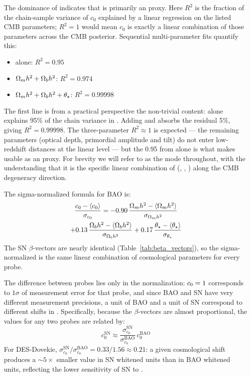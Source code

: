 The dominance of \omh indicates that \czero is primarily an \omh proxy. Here $R^2$ is the fraction of the chain-sample variance of $c_0$ explained by a linear regression on the listed CMB parameters; $R^2 = 1$ would mean $c_0$ is exactly a linear combination of those parameters across the CMB posterior. Sequential multi-parameter fits quantify this:
\begin{itemize}
\item \omh alone: $R^2 = 0.95$
\item $\Omega_m h^2 + \Omega_b h^2$: $R^2 = 0.974$
\item $\Omega_m h^2 + \Omega_b h^2 + \theta_\star$: $R^2 = 0.99998$
\end{itemize}
The first line is from a practical perspective the non-trivial content: \omh alone explains 95\% of the chain variance in \czero. Adding \obh and \thetastar absorbs the residual 5\%, giving $R^2 = 0.99998$. The three-parameter $R^2 \approx 1$ is expected --- the remaining \LCDM parameters (optical depth, primordial amplitude and tilt) do not enter low-redshift distances at the linear level --- but the 0.95 from \omh alone is what makes \czero usable as an \omh proxy. For brevity we will refer to \czero as the \omh mode throughout, with the understanding that it is the specific linear combination of (\omh, \obh, \thetastar) along the CMB degeneracy direction.


The sigma-normalized formula for BAO is:
\begin{multline}
\frac{c_0 - \langle c_0 \rangle}{\sigma_{c_0}} = -0.90\, \frac{\Omega_m h^2 - \langle \Omega_m h^2 \rangle}{\sigma_{\Omega_m h^2}} \\
+ 0.13\, \frac{\Omega_b h^2 - \langle \Omega_b h^2 \rangle}{\sigma_{\Omega_b h^2}} + 0.17\, \frac{\theta_\star - \langle \theta_\star \rangle}{\sigma_{\theta_\star}}
\label{eq:c0_formula}
\end{multline}
The SN $\beta$-vectors are nearly identical (Table~\ref{tab:beta_vectors}), so the sigma-normalized \czero is the same linear combination of cosmological parameters for every probe. 

The difference between probes lies only in the normalization: $c_0 = 1$ corresponds to $1\sigma$ of measurement error for that probe, and since BAO and SN have very different measurement precisions, a unit of BAO \czero and a unit of SN \czero correspond to different shifts in \omh. Specifically, because the $\beta$-vectors are almost proportional, the \czero values for any two probes are related by:
\begin{equation}
c_0^\mathrm{SN} \approx \frac{\sigma_{c_0}^\mathrm{SN}}{\sigma_{c_0}^\mathrm{BAO}} \, c_0^\mathrm{BAO}
\label{eq:c0_sn_bao}
\end{equation}
For DES-Dovekie, $\sigma_{c_0}^\mathrm{SN}/\sigma_{c_0}^\mathrm{BAO} = 0.33/1.56 \approx 0.21$: a given cosmological shift produces a $\sim 5\times$ smaller \czero value in SN whitened units than in BAO whitened units, reflecting the lower sensitivity of SN to \omh.

